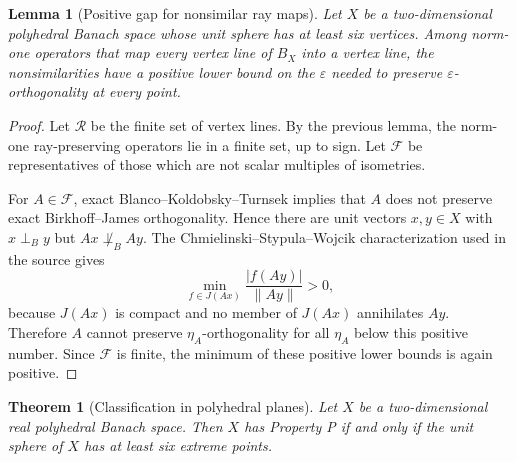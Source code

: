 \documentclass[11pt]{article}
\newtheorem{theorem}{Theorem}
\newtheorem{lemma}{Lemma}
\newcommand{\eps}{\varepsilon}
\begin{document}
\begin{lemma}[Positive gap for nonsimilar ray maps]
Let \(X\) be a two-dimensional polyhedral Banach space whose unit sphere has at
least six vertices.  Among norm-one operators that map every vertex line of
\(B_X\) into a vertex line, the nonsimilarities have a positive lower bound on
the \(\eps\) needed to preserve \(\eps\)-orthogonality at every point.
\end{lemma}

\begin{proof}
Let \(\mathcal R\) be the finite set of vertex lines.  By the previous lemma,
the norm-one ray-preserving operators lie in a finite set, up to sign.  Let
\(\mathcal F\) be representatives of those which are not scalar multiples of
isometries.

For \(A\in\mathcal F\), exact Blanco--Koldobsky--Turnsek implies that \(A\) does
not preserve exact Birkhoff--James orthogonality.  Hence there are unit vectors
\(x,y\in X\) with \(x\perp_B y\) but \(Ax\not\perp_B Ay\).  The
Chmielinski--Stypula--Wojcik characterization used in the source gives
\[
  \min_{f\in J(Ax)}\frac{|f(Ay)|}{\|Ay\|}>0,
\]
because \(J(Ax)\) is compact and no member of \(J(Ax)\) annihilates \(Ay\).
Therefore \(A\) cannot preserve \(\eta_A\)-orthogonality for all
\(\eta_A\) below this positive number.  Since \(\mathcal F\) is finite, the
minimum of these positive lower bounds is again positive.
\end{proof}

\begin{theorem}[Classification in polyhedral planes]
Let \(X\) be a two-dimensional real polyhedral Banach space.  Then \(X\) has
Property P if and only if the unit sphere of \(X\) has at least six extreme
points.
\end{theorem}
\end{document}
